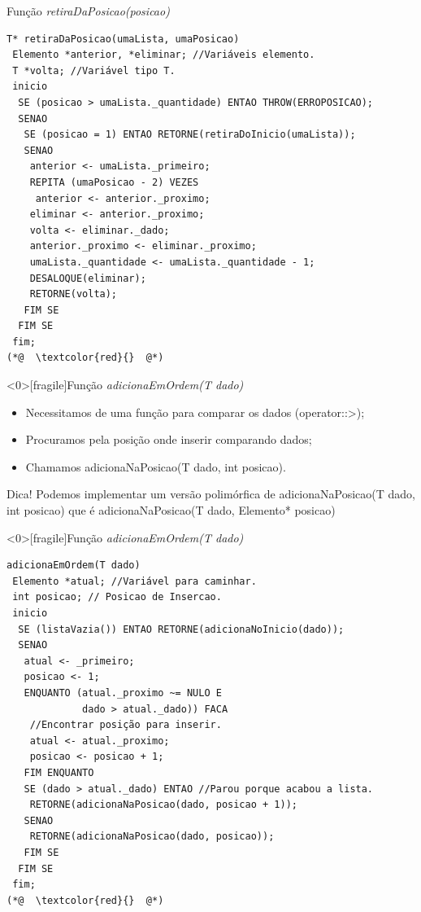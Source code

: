 \documentclass[12pt,table,xcolor={dvipsnames}]{beamer}
\begin{document}
\begin{frame}[fragile]{Função \textit{retiraDaPosicao(posicao)}}
\begin{lstlisting}
T* retiraDaPosicao(umaLista, umaPosicao)
 Elemento *anterior, *eliminar; //Variáveis elemento.
 T *volta; //Variável tipo T.
 inicio
  SE (posicao > umaLista._quantidade) ENTAO THROW(ERROPOSICAO);
  SENAO
   SE (posicao = 1) ENTAO RETORNE(retiraDoInicio(umaLista));
   SENAO
    anterior <- umaLista._primeiro;
    REPITA (umaPosicao - 2) VEZES
     anterior <- anterior._proximo;
    eliminar <- anterior._proximo;
    volta <- eliminar._dado;
    anterior._proximo <- eliminar._proximo;
    umaLista._quantidade <- umaLista._quantidade - 1;
    DESALOQUE(eliminar);
    RETORNE(volta);
   FIM SE
  FIM SE
 fim;
(*@  \textcolor{red}{}  @*)
\end{lstlisting}
\end{frame}


\begin{frame}<0>[fragile]{Função \textit{adicionaEmOrdem(T dado)}}
\begin{itemize}
\item Necessitamos de uma função para comparar os dados (operator::>);
\item Procuramos pela posição onde inserir comparando dados;
\item Chamamos adicionaNaPosicao(T dado, int posicao).
\end{itemize}
\begin{block}{Dica!}
Podemos implementar um versão polimórfica de adicionaNaPosicao(T dado, int posicao) que é adicionaNaPosicao(T dado, Elemento* posicao)
\end{block}
\end{frame}

\begin{frame}<0>[fragile]{Função \textit{adicionaEmOrdem(T dado)}}
\begin{lstlisting}
adicionaEmOrdem(T dado)
 Elemento *atual; //Variável para caminhar.
 int posicao; // Posicao de Insercao.
 inicio
  SE (listaVazia()) ENTAO RETORNE(adicionaNoInicio(dado));
  SENAO
   atual <- _primeiro;
   posicao <- 1;
   ENQUANTO (atual._proximo ~= NULO E
             dado > atual._dado)) FACA 
    //Encontrar posição para inserir.
    atual <- atual._proximo;
    posicao <- posicao + 1;
   FIM ENQUANTO
   SE (dado > atual._dado) ENTAO //Parou porque acabou a lista.
    RETORNE(adicionaNaPosicao(dado, posicao + 1));
   SENAO
    RETORNE(adicionaNaPosicao(dado, posicao));
   FIM SE
  FIM SE
 fim;
(*@  \textcolor{red}{}  @*)
\end{lstlisting}
\end{frame}
\end{document}
